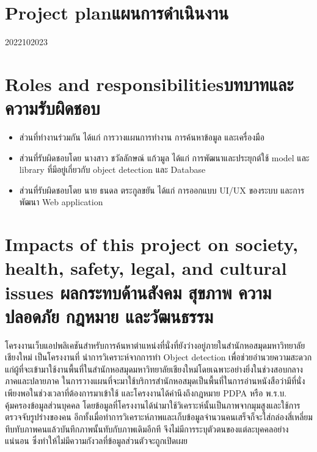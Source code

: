 \section{\ifenglish Project plan\else แผนการดำเนินงาน\fi}

\begin{plan}{11}{2022}{10}{2023}
\end{plan}

\section{\ifenglish Roles and responsibilities\else บทบาทและความรับผิดชอบ\fi}
\begin{itemize}
\item ส่วนที่ทำงานร่วมกัน ได้แก่ การวางแผนการทำงาน การค้นหาข้อมูล และเครื่องมือ
\item ส่วนที่รับผิดชอบโดย นางสาว ชวัลลักษณ์ แก้วมูล ได้แก่ การพัฒนาและประยุกต์ใช้ model และ library ที่มีอยู่เกี่ยวกับ object detection และ Database
\item ส่วนที่รับผิดชอบโดย นาย ธนดล ตระกูลขยัน ได้แก่ การออกแบบ UI/UX ของระบบ และการพัฒนา Web application
\end{itemize}
\section{\ifenglish%
Impacts of this project on society, health, safety, legal, and cultural issues
\else%
ผลกระทบด้านสังคม สุขภาพ ความปลอดภัย กฎหมาย และวัฒนธรรม
\fi}
โครงงานเว็บแอปพลิเคชันสำหรับการค้นหาตำแหน่งที่นั่งที่ยังว่างอยู่ภายในสำนักหอสมุดมหาวิทยาลัยเชียงใหม่ เป็นโครงงานที่
นำการวิเคราะห์จากการทำ Object detection เพื่อช่วยอำนวยความสะดวกแก่ผู้ที่จะเข้ามาใช้งานพื้นที่ในสำนักหอสมุดมหาวิทยาลัยเชียงใหม่โดยเฉพาะอย่างยิ่งในช่วงสอบกลางภาคและปลายภาค
ในการวางแผนที่จะมาใช้บริการสำนักหอสมุดเป็นพื้นที่ในการอ่านหนังสือว่ามีที่นั่งเพียงพอในช่วงเวลาที่ต้องการมาเข้าใช้ และโครงงานได้คำนึงถึงกฎหมาย PDPA หรือ พ.ร.บ. คุ้มครองข้อมูลส่วนบุคคล 
โดยข้อมูลที่โครงงานได้นำมาใช้วิเคราะห์นั้นเป็นภาพจากมุมสูงและใช้การตรวจจับรูปร่างของคน อีกทั้งเมื่อทำการวิเคราะห์ภาพและเก็บข้อมูลจำนวนคนเสร็จก็จะใส่กล่องสี่เหลี่ยมทึบทับภาพคนแล้วบันทึกภาพนั้นทับกับภาพเดิมอีกที จึงไม่มีการระบุตัวตนของแต่ละบุคคลอย่างแน่นอน
ซึ่งทำให้ไม่มีความกังวลที่ข้อมูลส่วนตัวจะถูกเปิดเผย
